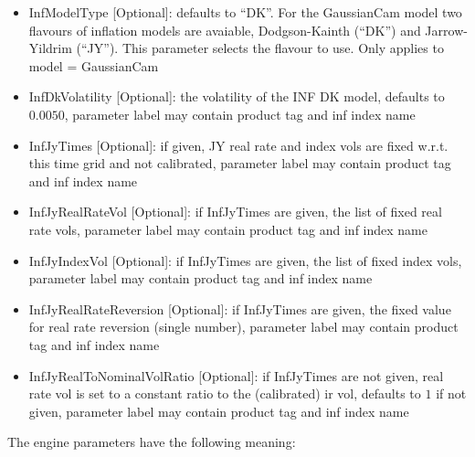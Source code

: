 \begin{itemize}
\item InfModelType [Optional]: defaults to ``DK''. For the GaussianCam model two flavours of inflation models are
  avaiable, Dodgson-Kainth (``DK'') and Jarrow-Yildrim (``JY''). This parameter selects the flavour to use. Only applies
  to model = GaussianCam
\item InfDkVolatility [Optional]: the volatility of the INF DK model, defaults to $0.0050$, parameter label may contain
  product tag and inf index name
\item InfJyTimes [Optional]: if given, JY real rate and index vols are fixed w.r.t. this time grid and not calibrated,
  parameter label may contain product tag and inf index name
\item InfJyRealRateVol [Optional]: if InfJyTimes are given, the list of fixed real rate vols, parameter label may
  contain product tag and inf index name
\item InfJyIndexVol [Optional]: if InfJyTimes are given, the list of fixed index vols, parameter label may
  contain product tag and inf index name
\item InfJyRealRateReversion [Optional]: if InfJyTimes are given, the fixed value for real rate reversion (single
  number), parameter label may contain product tag and inf index name
\item InfJyRealToNominalVolRatio [Optional]: if InfJyTimes are not given, real rate vol is set to a constant ratio to
  the (calibrated) ir vol, defaults to $1$ if not given, parameter label may contain product tag and inf index name
\end{itemize}

The engine parameters have the following meaning:

